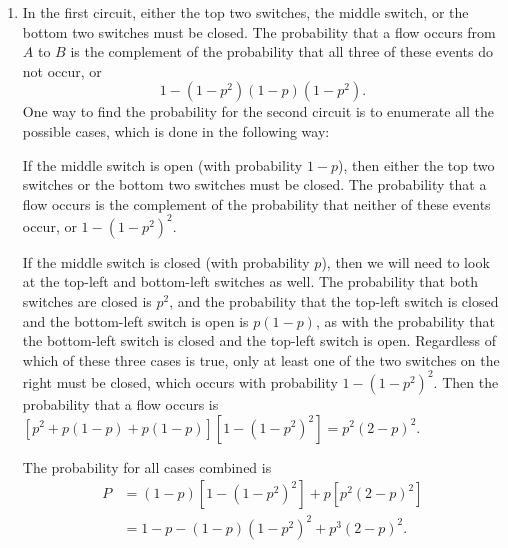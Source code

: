 \documentclass[a4paper,12pt]{article}
\begin{document}
\begin{enumerate}
	\item In the first circuit, either the top two switches, the middle switch, or the bottom two switches must be closed. The probability that a flow occurs from $A$ to $B$ is the complement of the probability that all three of these events do not occur, or
		\[ 1 - (1 - p^2)(1 - p)(1 - p^2). \]
	One way to find the probability for the second circuit is to enumerate all the possible cases, which is done in the following way: \par
	If the middle switch is open (with probability $1 - p$), then either the top two switches or the bottom two switches must be closed. The probability that a flow occurs is the complement of the probability that neither of these events occur, or $1 - (1 - p^2)^2$. \par
	If the middle switch is closed (with probability $p$), then we will need to look at the top-left and bottom-left switches as well. The probability that both switches are closed is $p^2$, and the probability that the top-left switch is closed and the bottom-left switch is open is $p(1 - p)$, as with the probability that the bottom-left switch is closed and the top-left switch is open. Regardless of which of these three cases is true, only at least one of the two switches on the right must be closed, which occurs with probability $1 - (1 - p^2)^2$. Then the probability that a flow occurs is $[p^2 + p(1 - p) + p(1 - p)][1 - (1 - p^2)^2] = p^2 (2 - p)^2$. \par
	The probability for all cases combined is
	\begin{align*}
		P &= (1 - p) [1 - (1 - p^2)^2] + p[p^2(2 - p)^2] \\
		&= 1 - p - (1 - p)(1 - p^2)^2 + p^3(2 - p)^2.
	\end{align*}
	

\end{enumerate}
\end{document}
